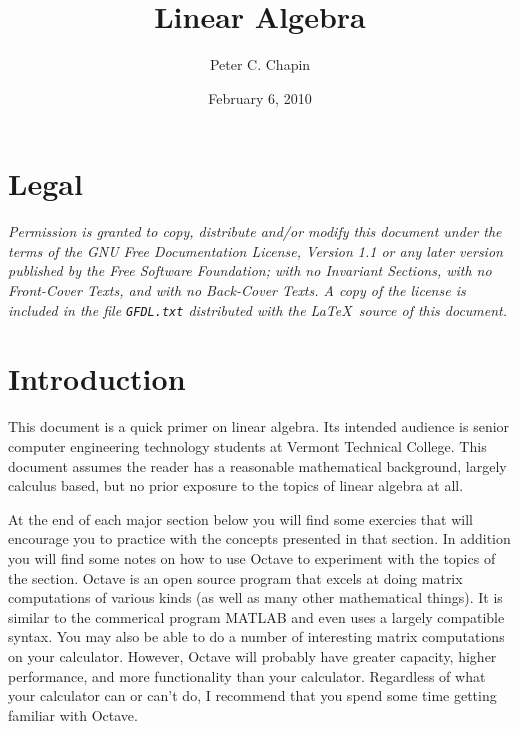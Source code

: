 \documentclass{article}
\begin{document}
\newcommand{\newterm}[1]{\emph{#1}}

\title{Linear Algebra}
\author{Peter C. Chapin}
\date{February 6, 2010}
\maketitle

\tableofcontents

\section*{Legal}
\label{sec:legal}

\textit{Permission is granted to copy, distribute and/or modify this document under the terms of
  the GNU Free Documentation License, Version 1.1 or any later version published by the Free
  Software Foundation; with no Invariant Sections, with no Front-Cover Texts, and with no
  Back-Cover Texts. A copy of the license is included in the file \texttt{GFDL.txt} distributed
  with the \LaTeX\ source of this document.}

\section{Introduction}
\label{sec:intro}

This document is a quick primer on linear algebra. Its intended audience is senior computer
engineering technology students at Vermont Technical College. This document assumes the reader
has a reasonable mathematical background, largely calculus based, but no prior exposure to the
topics of linear algebra at all.

At the end of each major section below you will find some exercies that will encourage you to
practice with the concepts presented in that section. In addition you will find some notes on
how to use Octave to experiment with the topics of the section. Octave is an open source program
that excels at doing matrix computations of various kinds (as well as many other mathematical
things). It is similar to the commerical program MATLAB and even uses a largely compatible
syntax. You may also be able to do a number of interesting matrix computations on your
calculator. However, Octave will probably have greater capacity, higher performance, and more
functionality than your calculator. Regardless of what your calculator can or can't do, I
recommend that you spend some time getting familiar with Octave.









\end{document}
